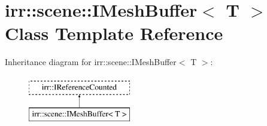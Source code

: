 \hypertarget{classirr_1_1scene_1_1IMeshBuffer}{}\section{irr\+:\+:scene\+:\+:I\+Mesh\+Buffer$<$ T $>$ Class Template Reference}
\label{classirr_1_1scene_1_1IMeshBuffer}
Inheritance diagram for irr\+:\+:scene\+:\+:I\+Mesh\+Buffer$<$ T $>$\+:\begin{figure}[H]
\begin{center}
\leavevmode
\includegraphics[height=2.000000cm]{classirr_1_1scene_1_1IMeshBuffer}
\end{center}
\end{figure}
